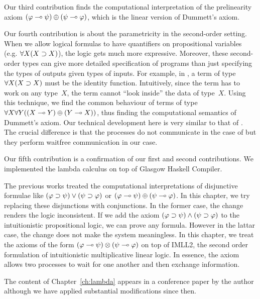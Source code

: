 Our third contribution finds the computational interpretation of
the prelinearity axiom
$(\varphi\multimap\psi)\oplus(\psi\multimap\varphi)$, which is the linear version of
Dummett's axiom.  

Our fourth contribution is about the parametricity in the second-order
setting.  When we allow logical formulas to have quantifiers on
propositional variables (e.g. $\forall X(X\supset X)$), the logic gets much
more expressive.
Moreover, these second-order types can give more detailed specification
of programs than just specifying the types of outputs given types of
inputs.
For example, in , a term of type $\forall X(X\supset X)$
must be the identity function.
Intuitively, since the term has to work on any type~$X$, the term cannot
``look inside''  the data of type~$X$.
Using this technique, we find the common behaviour of terms of type
$\forall X \forall Y ((X\multimap Y)\oplus (Y\multimap X))$, thus finding the
computational semantics of Dummett's axiom.
Our technical development here is very similar to that of
\citet{danos-krivine}.  The crucial difference is that the processes do
not communicate in the case of \citet{danos-krivine} but they perform
waitfree communication in our case.

Our fifth contribution is a confirmation of our first and second
contributions.
We implemented the lambda calculus on top of
Glasgow Haskell Compiler.


The previous works treated the computational interpretations of
disjunctive formulae like $(\varphi\supset\psi)\lor(\psi\supset\varphi)$ or
$(\varphi\multimap\psi)\oplus(\psi\multimap\varphi)$.  In this chapter, we try
replacing these disjunctions with conjunctions.
In the former case, the change renders the logic inconsistent.
If we add the axiom $(\varphi\supset\psi)\land(\psi\supset\varphi)$ to the
intuitionistic propositional logic,
we can prove any formula.  However in the lattar case, the change does
not make the system meaningless.
In this chapter, we treat
the axioms of the form $(\varphi\multimap\psi)\otimes(\psi\multimap\varphi)$
on top of IMLL2, the second order formulation of intuitionistic
multiplicative linear
logic.  In essence, the axiom allows two processes to wait for one
another and then exchange information.


The content of Chapter~\ref{ch:lambda} appears in
a conference paper by the author \citep{hiraiflops2012}
although we have applied substantial modifications since then.





